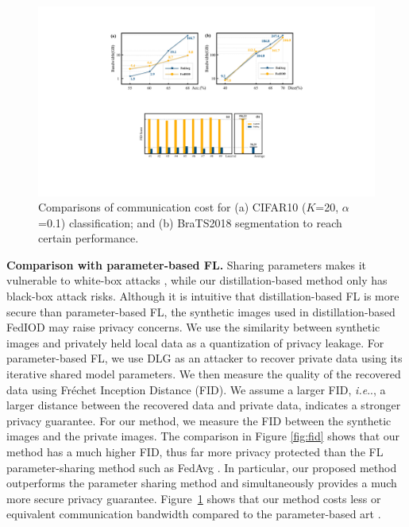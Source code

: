 \documentclass[letterpaper]{article} %
\makeatletter
\DeclareRobustCommand\onedot{\futurelet\@let@token\@onedot}
\def\@onedot{\ifx\@let@token.\else.\null\fi\xspace}
\def\ie{\emph{i.e}\onedot} \def\Ie{\emph{I.e}\onedot}
\makeatother
\begin{document}

\begin{figure}[b]
\centering
\includegraphics[width=\linewidth]{fig/fig5.pdf}
\caption{ Comparisons of communication cost for (a) CIFAR10 ($K$=20, $\alpha$=0.1) classification; and (b) BraTS2018 segmentation to reach certain performance.
}
\label{fig:bandwidth}
\end{figure}

 \textbf{Comparison with parameter-based FL.}
Sharing parameters makes it vulnerable to white-box attacks \cite{chang2019cronus, zhu2019deep, geiping2020inverting}, while our distillation-based method only has black-box attack risks. Although it is intuitive that distillation-based FL is more secure than parameter-based FL, the synthetic images used in distillation-based FedIOD may raise privacy concerns. We use the similarity between synthetic images and privately held local data as a quantization of privacy leakage.
For parameter-based FL, we use DLG \cite{zhu2019deep} as an attacker to recover private data using its iterative shared model parameters. We then measure the quality of the recovered data using Fréchet Inception Distance (FID). We assume a larger FID, \ie, a larger distance between the recovered data and private data, indicates a stronger privacy guarantee. For our method, we measure the FID between the synthetic images and the private images. The comparison in Figure \ref{fig:fid} shows that our method has a much higher FID, thus far more privacy protected than the FL parameter-sharing method such as FedAvg \cite{mcmahan2017communication}.
In particular, our proposed method outperforms the parameter sharing method \cite{mcmahan2017communication} and simultaneously provides a much more secure privacy guarantee. Figure~\ref{fig:bandwidth} shows that our method costs less or equivalent communication bandwidth compared to the parameter-based art \cite{mcmahan2017communication} .
\end{document}

